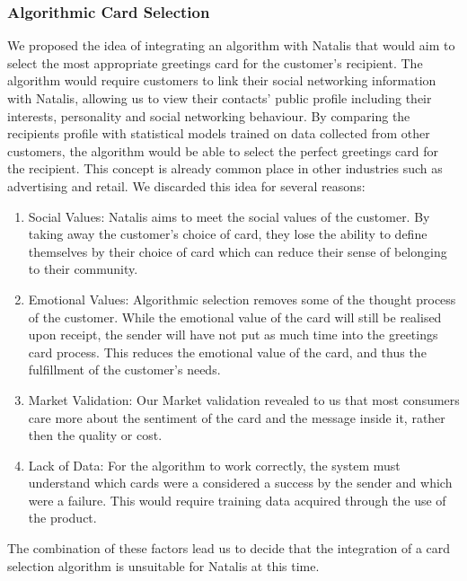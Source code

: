 \documentclass[10pt,a4paper]{article}
\begin{document}
\subsubsection*{Algorithmic Card Selection}
We proposed the idea of integrating an algorithm with Natalis that would aim to select the most appropriate greetings card for the customer's recipient. The algorithm would require customers to link their social networking information with Natalis, allowing us to view their contacts' public profile including their interests, personality and social networking behaviour. By comparing the recipients profile with statistical models trained on data collected from other customers, the algorithm would be able to select the perfect greetings card for the recipient. This concept is already common place in other industries such as advertising and retail.
We discarded this idea for several reasons:
\begin{enumerate}
  \item Social Values: Natalis aims to meet the social values of the customer. By taking away the customer's choice of card, they lose the ability to define themselves by their choice of card which can reduce their sense of belonging to their community.
  \item Emotional Values: Algorithmic selection removes some of the thought process of the customer. While the emotional value of the card will still be realised upon receipt, the sender will have not put as much time into the greetings card process. This reduces the emotional value of the card, and thus the fulfillment of the customer's needs.
  \item Market Validation: Our Market validation revealed to us that most consumers care more about the sentiment of the card and the message inside it, rather then the quality or cost.
  \item Lack of Data: For the algorithm to work correctly, the system must understand which cards were a considered a success by the sender and which were a failure. This would require training data acquired through the use of the product.
\end{enumerate}
The combination of these factors lead us to decide that the integration of a card selection algorithm is unsuitable for Natalis at this time.
\end{document}
